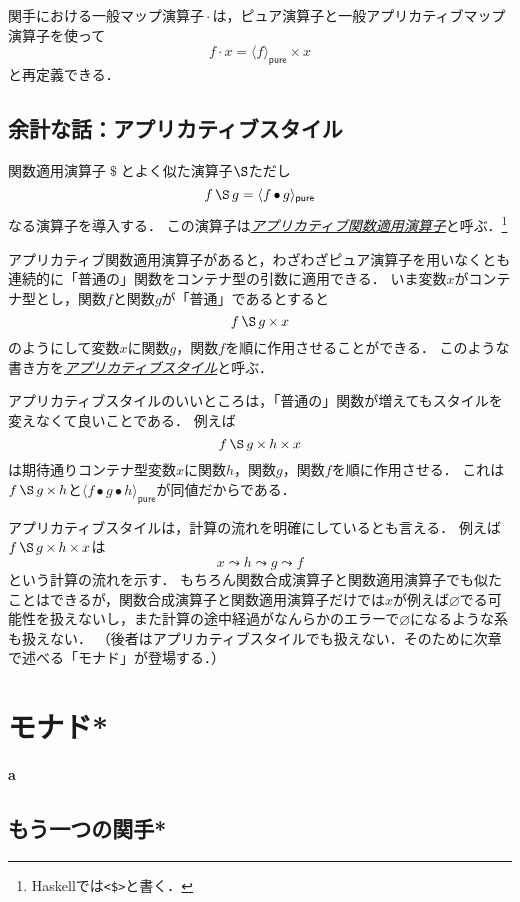 \documentclass[twocolumn]{jsbook}
\newcommand{\keyword}[1]{\underline{\emph{#1}}}
\newcommand{\code}[1]{\texttt{#1}}
\newenvironment{leader}{\begingroup\bf}{\endgroup}
\DeclareMathOperator{\hsklApplicativeApply}{\S}
\DeclareMathOperator{\hsklApplicativeMap}{\times}
\DeclareMathOperator{\hsklFmap}{\cdot}
\newcommand{\hsklNothing}{\varnothing}
\newcommand{\hsklPure}[1]{\langle#1\rangle_\textsf{pure}}
\DeclareMathOperator{\mathApply}{\$}
\DeclareMathOperator{\mathCompose}{\bullet}
\begin{document}
関手における一般マップ演算子$\hsklFmap$は，ピュア演算子と一般アプリカティブマップ演算子を使って$$f\hsklFmap x=\hsklPure{f}\hsklApplicativeMap x$$と再定義できる．

\section*{余計な話：アプリカティブスタイル}

関数適用演算子$\mathApply$とよく似た演算子$\hsklApplicativeApply$ただし
$$f\hsklApplicativeApply g=\hsklPure{f\mathCompose g}$$
なる演算子を導入する．
この演算子は\keyword{アプリカティブ関数適用演算子}と呼ぶ．\footnote{Haskellでは\code{<\$>}と書く．}

アプリカティブ関数適用演算子があると，わざわざピュア演算子を用いなくとも連続的に「普通の」関数をコンテナ型の引数に適用できる．
いま変数$x$がコンテナ型とし，関数$f$と関数$g$が「普通」であるとすると$$f\hsklApplicativeApply g\hsklApplicativeMap x$$のようにして変数$x$に関数$g$，関数$f$を順に作用させることができる．
このような書き方を\keyword{アプリカティブスタイル}と呼ぶ．

アプリカティブスタイルのいいところは，「普通の」関数が増えてもスタイルを変えなくて良いことである．
例えば$$f\hsklApplicativeApply g\hsklApplicativeMap h\hsklApplicativeMap x$$は期待通りコンテナ型変数$x$に関数$h$，関数$g$，関数$f$を順に作用させる．
これは$f\hsklApplicativeApply g\hsklApplicativeMap h$と$\hsklPure{f\mathCompose g\mathCompose h}$が同値だからである．

アプリカティブスタイルは，計算の流れを明確にしているとも言える．
例えば$f\hsklApplicativeApply g\hsklApplicativeMap h\hsklApplicativeMap x$は$$x\leadsto h\leadsto g\leadsto f$$という計算の流れを示す．
もちろん関数合成演算子と関数適用演算子でも似たことはできるが，関数合成演算子と関数適用演算子だけでは$x$が例えば$\hsklNothing$でる可能性を扱えないし，また計算の途中経過がなんらかのエラーで$\hsklNothing$になるような系も扱えない．
（後者はアプリカティブスタイルでも扱えない．そのために次章で述べる「モナド」が登場する．）


\chapter{モナド*}


\begin{leader}
a
\end{leader}


\section{もう一つの関手*}
\end{document}
